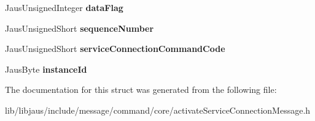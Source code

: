 \begin{DoxyCompactItemize}
\item 
\hypertarget{struct_activate_service_connection_message_struct_a85d16d75fdc4f9ee7ac76bde81d83ccb}{\-Jaus\-Unsigned\-Integer {\bfseries data\-Flag}}\label{struct_activate_service_connection_message_struct_a85d16d75fdc4f9ee7ac76bde81d83ccb}

\item 
\hypertarget{struct_activate_service_connection_message_struct_a697d44a2f9476906845af2a8ae1b39ce}{\-Jaus\-Unsigned\-Short {\bfseries sequence\-Number}}\label{struct_activate_service_connection_message_struct_a697d44a2f9476906845af2a8ae1b39ce}

\item 
\hypertarget{struct_activate_service_connection_message_struct_a6bccccfac3b51179d16bb5bdd19fbc9e}{\-Jaus\-Unsigned\-Short {\bfseries service\-Connection\-Command\-Code}}\label{struct_activate_service_connection_message_struct_a6bccccfac3b51179d16bb5bdd19fbc9e}

\item 
\hypertarget{struct_activate_service_connection_message_struct_ab5c5116b2334f634f64f63b7b1685e33}{\-Jaus\-Byte {\bfseries instance\-Id}}\label{struct_activate_service_connection_message_struct_ab5c5116b2334f634f64f63b7b1685e33}

\end{DoxyCompactItemize}


\-The documentation for this struct was generated from the following file\-:\begin{DoxyCompactItemize}
\item 
lib/libjaus/include/message/command/core/activate\-Service\-Connection\-Message.\-h\end{DoxyCompactItemize}
